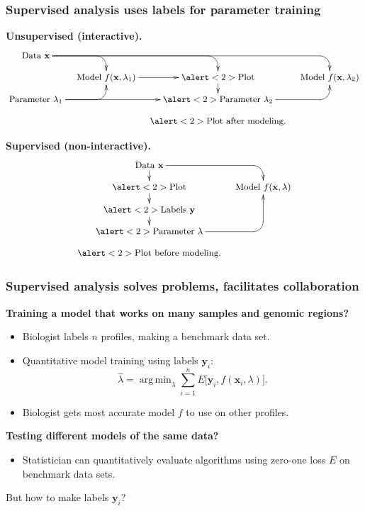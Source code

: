 \documentclass{beamer}
\DeclareMathOperator*{\argmin}{arg\,min}
\begin{document}
\begin{frame}
  \frametitle{Supervised analysis uses labels for parameter training}

    \textbf{Unsupervised (interactive).}
  \begin{displaymath}
    \small
  \xymatrix@=0.3cm{
    \text{Data $\mathbf x$}
    \ar `[r] [dr] 
    \ar `r[rr] [drr] 
    \ar `r[rrr] [drrr] 
    & \text{ }
    & \text{ }
    & \text{ }
    \\
    & 
    \text{Model $f(\mathbf x, \lambda_1)$} 
    \ar [r]
    & 
    \alert<2>{\text{Plot}}
    \ar[d]
    &
    \text{Model $f(\mathbf x, \lambda_2)$} 
    \\
    \text{Parameter $\lambda_1$}
    \ar `r[ru] [ru]
    \ar [rr]
    & \text{ }
    & \alert<2>{\text{Parameter $\lambda_2$}}
    \ar `r[ru] [ru] \\
    & &   \alert<2>{\text{Plot after modeling.}}
  }
  \end{displaymath}
  
  \textbf{Supervised (non-interactive).}
  \begin{displaymath}
    \small
  \xymatrix@=0.3cm{
    \text{Data $\mathbf x$}
    \ar `[r] [dr] 
    \ar [d]
    & \text{ }
    \\
    \alert<2>{\text{Plot} }
    \ar [d]
    & 
    \text{Model $f(\mathbf x, \lambda)$} 
    \\
    \alert<2>{\text{Labels $\mathbf y$}       }
    \ar [d]
    \\
    \alert<2>{\text{Parameter $\lambda$} }
    \ar `r[ruu] [ruu]
    & \text{ }\\
    \alert<2>{\text{Plot before modeling.}}
  }
\end{displaymath}

\end{frame}

\begin{frame}
  \frametitle{Supervised analysis solves problems, facilitates
    collaboration}
  \textbf{Training a model that works on many samples and genomic
    regions?} 
  \begin{itemize}
  \item Biologist labels $n$ profiles, making a benchmark data set.
  \item Quantitative model training using labels $\mathbf y_i$:
  \begin{equation*}
    \hat \lambda = \argmin_{\lambda}
    \sum_{i=1}^n
    E\big[
      \mathbf y_i,
      f(\mathbf x_i, \lambda)
    \big].
  \end{equation*}
  \item Biologist gets most accurate model $f$ to use on other profiles.
  \end{itemize}
  \textbf{Testing different models of the same data?} 
  \begin{itemize}
  \item Statistician can quantitatively evaluate algorithms using
    zero-one loss $E$ on benchmark data sets.
  \end{itemize}
  But how to make labels $\mathbf y_i$?
\end{frame}
\end{document}

